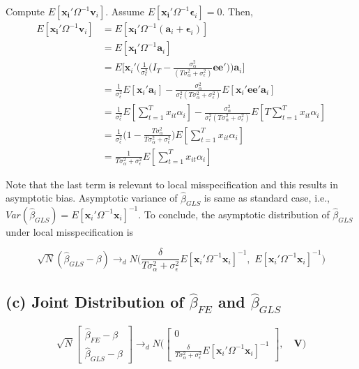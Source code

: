 \documentclass[11pt]{article}
\begin{document}
Compute $E[\mathbf{x_i}' \Omega^{-1} \mathbf{v}_i]$. Assume $E[\mathbf{x_i}' \Omega^{-1} \mathbf{\epsilon}_i]=0$. Then,
\begin{align*}
E[\mathbf{x_i}' \Omega^{-1} \mathbf{v}_i] &= E[\mathbf{x_i}' \Omega^{-1} (\mathbf{a}_i+\mathbf{\epsilon}_i)]\\
&= E[\mathbf{x_i}' \Omega^{-1} \mathbf{a}_i]\\
&= E \bigg[\mathbf{x}_i' \bigg(\frac{1}{\sigma_\epsilon^2} \big(I_T-\frac{\sigma_\alpha^2}{(T\sigma_\alpha^2 + \sigma_\epsilon^2)}\mathbf{ee'}\big) \bigg) \mathbf{a}_i \bigg]\\
&= \frac{1}{\sigma_\epsilon^2} E[\mathbf{x}_i' \mathbf{a}_i] - \frac{\sigma_\alpha^2}{\sigma_\epsilon^2 ( T\sigma_\alpha^2 + \sigma_\epsilon^2)} E[\mathbf{x}_i' \mathbf{ee'}\mathbf{a}_i]\\
&= \frac{1}{\sigma_\epsilon^2} E[\sum_{t=1}^T x_{it} \alpha_i] - \frac{\sigma_\alpha^2}{\sigma_\epsilon^2 ( T\sigma_\alpha^2 + \sigma_\epsilon^2)}  E[T\sum_{t=1}^T x_{it}\alpha_i]\\
&= \frac{1}{\sigma_\epsilon^2} \bigg(1- \frac{T\sigma_\alpha^2}{T\sigma_\alpha^2 + \sigma_\epsilon^2}\bigg)E[\sum_{t=1}^T x_{it}\alpha_i]\\
&= \frac{1}{T\sigma_\alpha^2 + \sigma_\epsilon^2} E[\sum_{t=1}^T x_{it}\alpha_i]
\end{align*}


Note that the last term is relevant to local misspecification and this results in asymptotic bias. Asymptotic variance of $\widehat{\beta}_{GLS}$ is same as standard case, i.e., $Var(\widehat{\beta}_{GLS}) = E[\mathbf{x}_i' \Omega^{-1} \mathbf{x}_i]^{-1}$. To conclude, the asymptotic distribution of $\widehat{\beta}_{GLS}$ under local misspecification is

\[
\sqrt{N} (\widehat{\beta}_{GLS}-\beta) \rightarrow_{d} N\big( \frac{\delta}{T\sigma_\alpha^2 + \sigma_\epsilon^2}  E[\mathbf{x}_i' \Omega^{-1} \mathbf{x}_i]^{-1},\,\, E[\mathbf{x}_i' \Omega^{-1} \mathbf{x}_i]^{-1}\big)
\]

\vspace{0.2in}


\subsection*{(c) Joint Distribution of $\widehat{\beta}_{FE}$ and $\widehat{\beta}_{GLS}$}

\vspace{0.2in}

\[
\sqrt{N}\begin{bmatrix}
\widehat{\beta}_{FE}-\beta\\
\widehat{\beta}_{GLS}-\beta
\end{bmatrix} \rightarrow_d 
N \bigg(
\begin{bmatrix}
0\\
\frac{\delta}{T\sigma_\alpha^2 + \sigma_\epsilon^2} E[\mathbf{x}_i' \Omega^{-1} \mathbf{x}_i]^{-1}
\end{bmatrix}, \quad \mathbf{V}
\bigg)
\]
\end{document}
